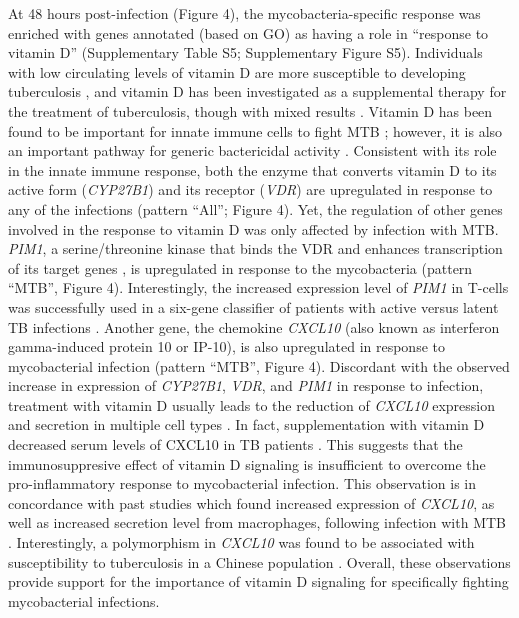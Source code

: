 At 48 hours post-infection (Figure 4), the mycobacteria-specific
response was enriched with genes annotated (based on GO) as having a
role in ``response to vitamin D'' (Supplementary Table S5; Supplementary
Figure S5). Individuals with low circulating levels of vitamin D are
more susceptible to developing tuberculosis \citep{Zodpey2007;
@Nnoaham2008}, and vitamin D has been investigated as a supplemental
therapy for the treatment of tuberculosis, though with mixed results
\citep{Martineau2007, Lucas2014, Xia2014, Kearns2015}. Vitamin D has
been found to be important for innate immune cells to fight MTB
\citep{Liu2006, Verway2013, Xu2014}; however, it is also an important
pathway for generic bactericidal activity \citep{Hewison2011}. Consistent
with its role in the innate immune response, both the enzyme that
converts vitamin D to its active form (\emph{CYP27B1}) and its receptor
(\emph{VDR}) are upregulated in response to any of the infections
(pattern ``All''; Figure 4). Yet, the regulation of other genes involved
in the response to vitamin D was only affected by infection with MTB.
\emph{PIM1}, a serine/threonine kinase that binds the VDR and enhances
transcription of its target genes \citep{Maier2012}, is upregulated in
response to the mycobacteria (pattern ``MTB'', Figure 4). Interestingly,
the increased expression level of \emph{PIM1} in T-cells was
successfully used in a six-gene classifier of patients with active
versus latent TB infections \citep{Jacobsen2011}. Another gene, the
chemokine \emph{CXCL10} (also known as interferon gamma-induced protein
10 or IP-10), is also upregulated in response to mycobacterial infection
(pattern ``MTB'', Figure 4). Discordant with the observed increase in
expression of \emph{CYP27B1}, \emph{VDR}, and \emph{PIM1} in response to
infection, treatment with vitamin D usually leads to the reduction of
\emph{CXCL10} expression and secretion in multiple cell types
\citep{Gysemans2005, Adorini2005, Scolletta2013}. In fact,
supplementation with vitamin D decreased serum levels of CXCL10 in TB
patients \citep{Coussens2012}. This suggests that the immunosuppresive
effect of vitamin D signaling is insufficient to overcome the
pro-inflammatory response to mycobacterial infection. This observation
is in concordance with past studies which found increased expression of
\emph{CXCL10}, as well as increased secretion level from macrophages,
following infection with MTB \citep{Zhu2006, Verway2013}. Interestingly,
a polymorphism in \emph{CXCL10} was found to be associated with
susceptibility to tuberculosis in a Chinese population \citep{Tang2009;
@Azad2012}. Overall, these observations provide support for the
importance of vitamin D signaling for specifically fighting
mycobacterial infections.

